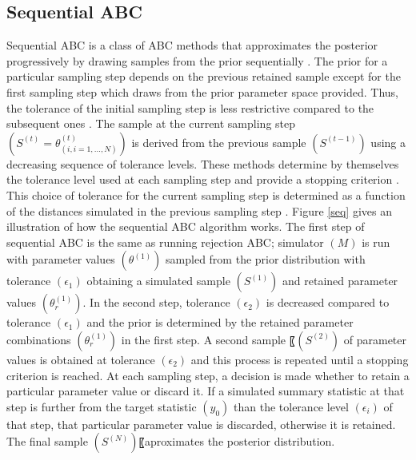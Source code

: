 \subsection{Sequential ABC}
Sequential ABC is a class of ABC methods that approximates the posterior progressively by drawing samples from the prior sequentially \cite{lenormand}. The prior for a particular sampling step depends on the previous retained sample except for the first sampling step which draws from the prior parameter space provided. Thus, the tolerance of the initial sampling step is less restrictive compared to the subsequent ones \cite{Mckinley}. The sample at the current sampling step $(S^{(t)} = \theta_{(i,i=1,…, N)}^{(t)})$ is derived from the previous sample $(S^{(t-1)})$ using a decreasing sequence of tolerance levels. These methods determine by themselves the tolerance level used at each sampling step and provide a stopping criterion \cite{lenormand}. This choice of tolerance for the current sampling step is determined as a function of the distances simulated in the previous sampling step \cite{Mckinley}. Figure \ref{seq} gives an illustration of how the sequential ABC algorithm works. The first step of sequential ABC is the same as running rejection ABC; simulator $(M)$ is run with parameter values $(\theta^{(1)})$ sampled from the prior distribution with tolerance  $(\epsilon_1)$ obtaining a simulated sample $(S^{(1)})$ and retained parameter values $(\theta_{r }^{(1)})$. In the second step, tolerance $(\epsilon_2)$ is decreased compared to tolerance $(\epsilon_1)$ and the prior is determined by the retained parameter combinations $(\theta_{r }^{(1)})$ in the first step. A second sample 〖$(S^{(2)})$ of parameter values is obtained at tolerance $(\epsilon_2)$  and this process is repeated until a stopping criterion is reached. At each sampling step, a decision is made whether to retain a particular parameter value or discard it. If a simulated summary statistic at that step is further from the target statistic $(y_0)$ than the tolerance level $(\epsilon_i)$ of that step, that particular parameter value is discarded, otherwise it is retained. The final sample $(S^{(N)})$〖aproximates the posterior distribution. 

